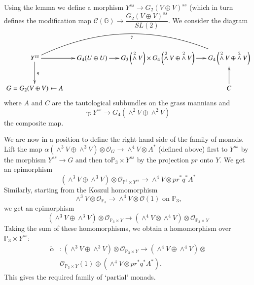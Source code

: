 Using the lemma we define a morphism $Y^{ss}\to G_2(V\oplus V)^{ss}$ (which in turn defines the modification map $\mathscr{C}(\mathbb{G})\to \dfrac{G_2(V\oplus V)^{ss}}{SL(2)}$. We consider the diagram  
{\fontsize{8}{10}\selectfont
$$
\xymatrix@C=.5cm{Y^{ss}\ar@{-}@/^3pc/[rrr]_{\gamma} 
  \ar[r]\ar[d]^{q}&G_4(U\oplus U)\ar[r]&G_3\left(\displaystyle\mathop{\wedge}^{2} V\right)\times G_4\left(\displaystyle\mathop{\wedge}^{2}V\oplus \displaystyle\mathop{\wedge}^{2} V\right)\ar[r]&G_4\left(\displaystyle\mathop{\wedge}^{2} V\oplus \displaystyle\mathop{\wedge}^{2}V\right)\\
G=G_2(V\oplus V)\leftarrow A && & C\ar[u]}
$$}\relax
where $A$ and $C$ are the tautological subbundles on the grass mannians and 
$$
\gamma:Y^{ss}\to G_4\left(\displaystyle\mathop{\wedge}^{2}V\oplus \displaystyle\mathop{\wedge}^{2} V\right) 
$$
the composite map. 

We are now in a position to define the right hand side of the family of monads. Lift the map $\alpha\left(\displaystyle\mathop{\wedge}^{3}V\oplus \displaystyle\mathop{\wedge} ^{3}V\right) \otimes \mathscr{O}_G\to \displaystyle\mathop{\wedge}^{4} V\otimes A^{\ast}$ (defined above) first to $Y^{ss}$ by the morphism $Y^{ss}\to G$ and then to\pageoriginale $\mathbb{P}_3\times Y^{ss}$ by the projection $pr$ onto $Y$. We get an epimorphism 
$$
\left(\displaystyle\mathop{\wedge}^{3}V\oplus \displaystyle\mathop{\wedge}^{3} V\right)\otimes \mathscr{O}_{\mathbb{P}^{3}\times Y^{ss}}\to \displaystyle\mathop{\wedge}^{4}V\otimes pr^{\ast}q^{\ast}A^{\ast}
$$
Similarly, starting from the Koszul homomorphism 
$$
\displaystyle\mathop{\wedge}^{3} V \otimes \mathscr{O}_{\mathbb{P}_3}\to \displaystyle\mathop{\wedge}^{4} V\otimes \mathscr{O}(1) \text{ on } \mathbb{P}_3,
$$
we get an epimorphism 
\begin{equation}
\left(\displaystyle\mathop{\wedge}^{3}V\oplus \displaystyle\mathop{\wedge}^{3}V\right)\otimes \mathscr{O}_{\mathbb{P}_3\times Y}\to \left(\displaystyle\mathop{\wedge}^{4}V\otimes \displaystyle\mathop{\wedge}^{4}V\right) \otimes \mathscr{O}_{\mathbb{P}_3\times Y}
\end{equation}
Taking the sum of these homomorphisms, we obtain a homomorphism over $\mathbb{P}_{3}\times Y^{ss}$: 
$$
\begin{aligned}
\widetilde{\alpha}&:\left(\displaystyle\mathop{\wedge}^{3} V\oplus \displaystyle\mathop{\wedge}^{3}V\right)\otimes \mathscr{O}_{\mathbb{P}_3\times Y} \to \left(\displaystyle\mathop{\wedge}^{4}V\oplus \displaystyle\mathop{\wedge}^{4} V\right)\otimes\\ &{}\mathscr{O}_{\mathbb{P}_3\times Y}(1) \oplus \left(\displaystyle\mathop{\wedge}^{4} V\otimes pr^{\ast} q^{\ast}A^{\ast}\right).
\end{aligned}
$$
This gives the required family of `partial' monads. 

